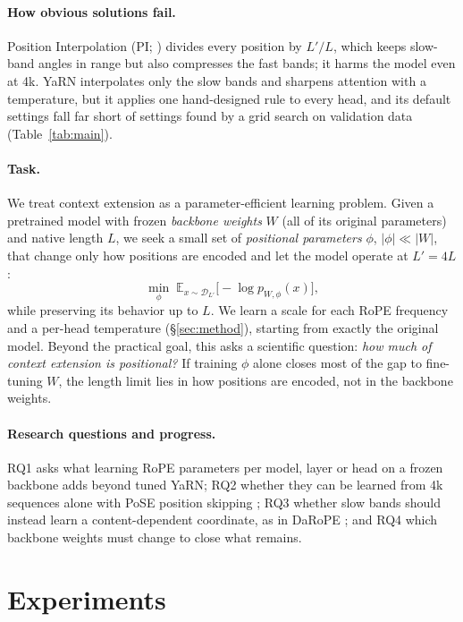 \documentclass[11pt]{article}
\begin{document}
\paragraph{How obvious solutions fail.}
Position Interpolation (PI; \citealp{chen2023pi}) divides every position by $L'/L$, which keeps slow-band angles in range but also compresses the fast bands; it harms the model even at 4k. YaRN \citep{peng2024yarn} interpolates only the slow bands and sharpens attention with a temperature, but it applies one hand-designed rule to every head, and its default settings fall far short of settings found by a grid search on validation data (Table~\ref{tab:main}).

\paragraph{Task.}
We treat context extension as a parameter-efficient learning problem. Given a pretrained model with frozen \emph{backbone weights} $W$ (all of its original parameters) and native length $L$, we seek a small set of \emph{positional parameters} $\phi$, $|\phi| \ll |W|$, that change only how positions are encoded and let the model operate at $L' = 4L$:
\begin{equation}
\min_{\phi}\; \mathbb{E}_{x\sim\mathcal{D}_{L'}}\big[-\log p_{W,\phi}(x)\big],
\end{equation}
while preserving its behavior up to $L$. We learn a scale for each RoPE frequency and a per-head temperature (\S\ref{sec:method}), starting from exactly the original model. Beyond the practical goal, this asks a scientific question: \emph{how much of context extension is positional?} If training $\phi$ alone closes most of the gap to fine-tuning $W$, the length limit lies in how positions are encoded, not in the backbone weights.

\paragraph{Research questions and progress.}
RQ1 asks what learning RoPE parameters per model, layer or head on a frozen backbone adds beyond tuned YaRN; RQ2 whether they can be learned from 4k sequences alone with PoSE position skipping \citep{zhu2024pose}; RQ3 whether slow bands should instead learn a content-dependent coordinate, as in DaRoPE \citep{levy2026darope}; and RQ4 which backbone weights must change to close what remains.

\section{Experiments}
\end{document}
